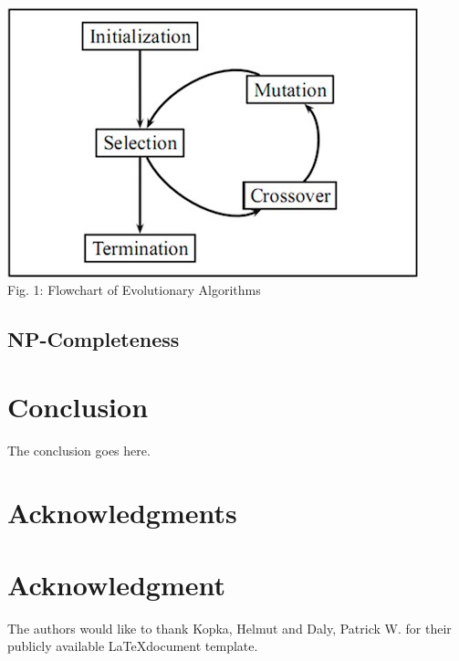 \documentclass[conference,compsoc]{IEEEtran}
\begin{document}
\paragraph{}
\begin{center}
\includegraphics[scale=0.4]{Report/EAflow.png}\\
    Fig. 1: Flowchart of Evolutionary Algorithms
\end{center}

\subsection{NP-Completeness}




\section{Conclusion}
The conclusion goes here.



\ifCLASSOPTIONcompsoc
  \section*{Acknowledgments}
\else
  \section*{Acknowledgment}
\fi


The authors would like to thank Kopka, Helmut and Daly, Patrick W. \cite{10.5555/940746} for their publicly available \LaTeX document template.











\end{document}
